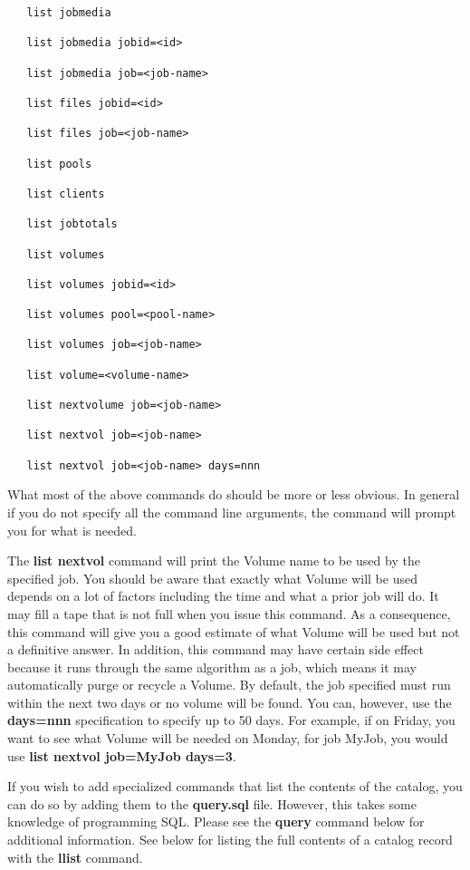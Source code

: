 \begin{description}
{\begin{verbatim}
   list jobmedia

   list jobmedia jobid=<id>

   list jobmedia job=<job-name>

   list files jobid=<id>

   list files job=<job-name>

   list pools

   list clients

   list jobtotals

   list volumes

   list volumes jobid=<id>

   list volumes pool=<pool-name>

   list volumes job=<job-name>

   list volume=<volume-name>

   list nextvolume job=<job-name>

   list nextvol job=<job-name>

   list nextvol job=<job-name> days=nnn

\end{verbatim}
\normalsize

   What most of the above commands do should be more or less obvious.  In
   general if you do not specify all the command line arguments, the
   command will prompt you for what is needed.

   The {\bf list nextvol} command will print the Volume name to be used by
   the specified job.  You should be aware that exactly what Volume will be
   used depends on a lot of factors including the time and what a prior job
   will do.  It may fill a tape that is not full when you issue this
   command.  As a consequence, this command will give you a good estimate
   of what Volume will be used but not a definitive answer.  In addition,
   this command may have certain side effect because it runs through the
   same algorithm as a job, which means it may automatically purge or
   recycle a Volume. By default, the job specified must run within the
   next two days or no volume will be found. You can, however, use the
   {\bf days=nnn} specification to specify up to 50 days. For example,
   if on Friday, you want to see what Volume will be needed on Monday,
   for job MyJob, you would use {\bf list nextvol job=MyJob days=3}.

   If you wish to add specialized commands that list the contents of the
   catalog, you can do so by adding them to the {\bf query.sql} file.
   However, this takes some knowledge of programming SQL. Please see the
   {\bf query} command below for additional information.  See below for
   listing the full contents of a catalog record with the {\bf llist}
   command.

}
\end{description}
